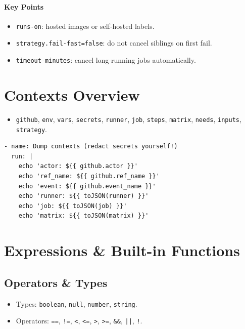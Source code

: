\documentclass[11pt]{article}
\begin{document}
\paragraph{Key Points}
\begin{itemize}
  \item \texttt{runs-on}: hosted images or self-hosted labels.
  \item \texttt{strategy.fail-fast=false}: do not cancel siblings on first fail.
  \item \texttt{timeout-minutes}: cancel long-running jobs automatically.
\end{itemize}

\section{Contexts Overview}
\begin{itemize}
  \item \texttt{github}, \texttt{env}, \texttt{vars}, \texttt{secrets}, \texttt{runner}, \texttt{job}, \texttt{steps}, \texttt{matrix}, \texttt{needs}, \texttt{inputs}, \texttt{strategy}.
\end{itemize}
\begin{verbatim}
- name: Dump contexts (redact secrets yourself!)
  run: |
    echo 'actor: ${{ github.actor }}'
    echo 'ref_name: ${{ github.ref_name }}'
    echo 'event: ${{ github.event_name }}'
    echo 'runner: ${{ toJSON(runner) }}'
    echo 'job: ${{ toJSON(job) }}'
    echo 'matrix: ${{ toJSON(matrix) }}'
\end{verbatim}

\section{Expressions \& Built-in Functions}
\subsection{Operators \& Types}
\begin{itemize}
  \item Types: \texttt{boolean}, \texttt{null}, \texttt{number}, \texttt{string}.
  \item Operators: \texttt{==}, \texttt{!=}, \texttt{<}, \texttt{<=}, \texttt{>}, \texttt{>=}, \texttt{\&\&}, \texttt{||}, \texttt{!}.
\end{itemize}
\end{document}
